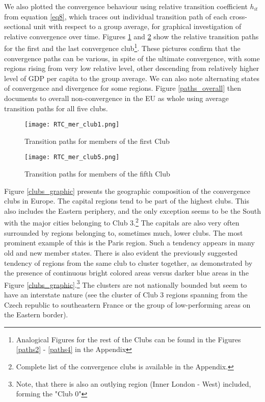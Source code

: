 \documentclass[11pt]{article}
\begin{document}
We also plotted the convergence behaviour using relative transition coefficient $h_{it}$ from equation \ref{eq8}, which traces out individual transition path of each cross-sectional unit with respect to a group average, for graphical investigation of relative convergence over time. Figures \ref{paths1} and \ref{paths5} show the relative transition paths for the first and the last convergence club\footnote{Analogical Figures for the rest of the Clubs can be found in the Figures \ref{paths2} - \ref{paths4} in the Appendix}. These pictures confirm that the convergence paths can be various, in spite of the ultimate convergence, with some regions rising from very low relative level, other descending from relatively higher level of GDP per capita to the group average. We can also note alternating states of convergence and divergence for some regions. Figure \ref{paths_overall} then documents to overall non-convergence in the EU as whole using average transition paths for all five clubs.

\begin{figure}%
    \centering
    \texttt{[image: RTC\_mer\_club1.png]}
    \caption{Transition paths for members of the first Club}
    \label{paths1}
\end{figure}

\begin{figure}%
    \centering
    \texttt{[image: RTC\_mer\_club5.png]}
    \caption{Transition paths for members of the fifth Club }
    \label{paths5}
\end{figure}


Figure \ref{clubs_graphic} presents the geographic composition of the convergence clubs in Europe. The capital regions tend to be part of the highest clubs. This also includes the Eastern periphery, and the only exception seems to be the South with the major cities belonging to Club 3.\footnote{Complete list of the convergence clubs is available in the Appendix.} The capitals are also very often surrounded by regions belonging to, sometimes much, lower clubs. The most prominent example of this is the Paris region. Such a tendency appears in many old and new member states. There is also evident the previously suggested tendency of regions from the same club to cluster together, as demonstrated by the presence of continuous bright colored areas versus darker blue areas in the Figure \ref{clubs_graphic}.\footnote{Note, that there is also an outlying region (Inner London - West) included, forming the "Club 0"} The clusters are not nationally bounded but seem to have an interstate nature (see the cluster of Club 3 regions spanning from the Czech republic to southeastern France or the group of low-performing areas on the Eastern border).
\end{document}
